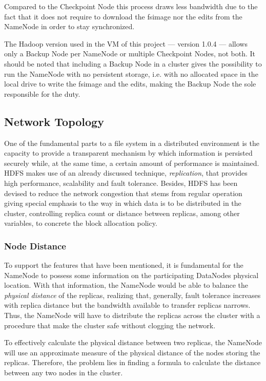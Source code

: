 Compared to the Checkpoint Node this process draws less bandwidth due to the fact that it does not require to download the fsimage nor the edits from the NameNode in order to stay synchronized.

The Hadoop version used in the VM of this project --- version 1.0.4 --- allows only a Backup Node per NameNode or multiple Checkpoint Nodes, not both. It should be noted that including a Backup Node in a cluster gives the possibility to run the NameNode with no persistent storage, i.e. with no allocated space in the local drive to write the fsimage and the edits, making the Backup Node the sole responsible for the duty.

\subsection{Network Topology}\label{subsec:topologiared}
\noindent One of the fundamental parts to a file system in a distributed environment is the capacity to provide a transparent mechanism by which information is persisted securely while, at the same time, a certain amount of performance is maintained. HDFS makes use of an already discussed technique, \emph{replication}, that provides high performance, scalability and fault tolerance. Besides, HDFS has been devised to reduce the network congestion that stems from regular operation giving special emphasis to the way in which data is to be distributed in the cluster, controlling replica count or distance between replicas, among other variables, to concrete the block allocation policy.

\subsubsection{Node Distance}\label{subsubsec:distnodos}
\noindent To support the features that have been mentioned, it is fundamental for the NameNode to possess some information on the participating DataNodes physical location. With that information, the NameNode would be able to balance the \emph{physical distance} of the replicas, realizing that, generally, fault tolerance increases with replica distance but the bandwidth available to transfer replicas narrows. Thus, the NameNode will have to distribute the replicas across the cluster with a procedure that make the cluster safe without clogging the network.

To effectively calculate the physical distance between two replicas, the NameNode will use an approximate measure of the physical distance of the nodes storing the replicas. Therefore, the problem lies in finding a formula to calculate the distance between any two nodes in the cluster.

